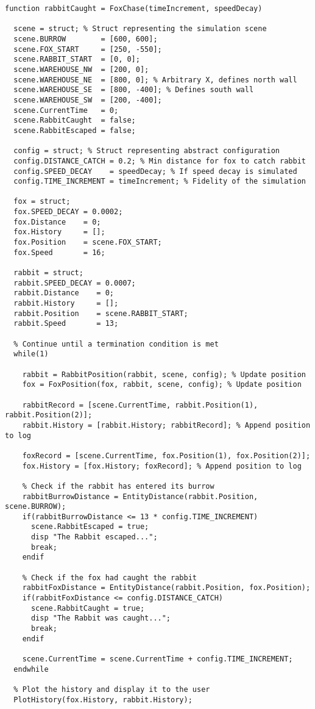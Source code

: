\documentclass[11pt]{article}
\begin{document}
\begin{lstlisting}
function rabbitCaught = FoxChase(timeIncrement, speedDecay)
  
  scene = struct; % Struct representing the simulation scene
  scene.BURROW        = [600, 600];
  scene.FOX_START     = [250, -550];
  scene.RABBIT_START  = [0, 0];
  scene.WAREHOUSE_NW  = [200, 0];
  scene.WAREHOUSE_NE  = [800, 0]; % Arbitrary X, defines north wall
  scene.WAREHOUSE_SE  = [800, -400]; % Defines south wall
  scene.WAREHOUSE_SW  = [200, -400];
  scene.CurrentTime   = 0;
  scene.RabbitCaught  = false;
  scene.RabbitEscaped = false;
  
  config = struct; % Struct representing abstract configuration
  config.DISTANCE_CATCH = 0.2; % Min distance for fox to catch rabbit
  config.SPEED_DECAY    = speedDecay; % If speed decay is simulated
  config.TIME_INCREMENT = timeIncrement; % Fidelity of the simulation
  
  fox = struct;
  fox.SPEED_DECAY = 0.0002;
  fox.Distance    = 0;
  fox.History     = [];
  fox.Position    = scene.FOX_START;
  fox.Speed       = 16;  
  
  rabbit = struct;
  rabbit.SPEED_DECAY = 0.0007;
  rabbit.Distance    = 0;
  rabbit.History     = [];
  rabbit.Position    = scene.RABBIT_START;
  rabbit.Speed       = 13;
  
  % Continue until a termination condition is met
  while(1)
    
    rabbit = RabbitPosition(rabbit, scene, config); % Update position
    fox = FoxPosition(fox, rabbit, scene, config); % Update position
    
    rabbitRecord = [scene.CurrentTime, rabbit.Position(1), rabbit.Position(2)];
    rabbit.History = [rabbit.History; rabbitRecord]; % Append position to log
    
    foxRecord = [scene.CurrentTime, fox.Position(1), fox.Position(2)]; 
    fox.History = [fox.History; foxRecord]; % Append position to log
    
    % Check if the rabbit has entered its burrow
    rabbitBurrowDistance = EntityDistance(rabbit.Position, scene.BURROW);
    if(rabbitBurrowDistance <= 13 * config.TIME_INCREMENT)
      scene.RabbitEscaped = true;
      disp "The Rabbit escaped...";
      break;
    endif
    
    % Check if the fox had caught the rabbit
    rabbitFoxDistance = EntityDistance(rabbit.Position, fox.Position);
    if(rabbitFoxDistance <= config.DISTANCE_CATCH)
      scene.RabbitCaught = true;
      disp "The Rabbit was caught...";
      break;
    endif
    
    scene.CurrentTime = scene.CurrentTime + config.TIME_INCREMENT;
  endwhile 
  
  % Plot the history and display it to the user
  PlotHistory(fox.History, rabbit.History);
 
\end{lstlisting}
\end{document}
